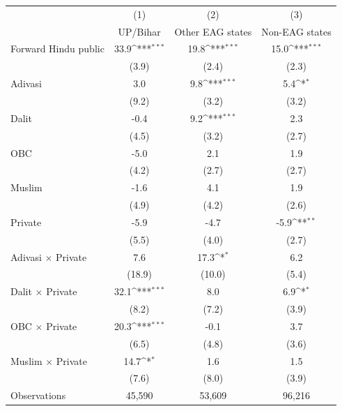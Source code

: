 {
\def\sym#1{\ifmmode^{#1}\else\(^{#1}\)\fi}
\begin{tabular}{l*{3}{c}}
\toprule
                    &\multicolumn{1}{c}{(1)}&\multicolumn{1}{c}{(2)}&\multicolumn{1}{c}{(3)}\\
                    &\multicolumn{1}{c}{UP/Bihar}&\multicolumn{1}{c}{Other EAG states}&\multicolumn{1}{c}{Non-EAG states}\\
\midrule
Forward Hindu public&        33.9\sym{***}&        19.8\sym{***}&        15.0\sym{***}\\
                    &       (3.9)         &       (2.4)         &       (2.3)         \\
\addlinespace
Adivasi             &         3.0         &         9.8\sym{***}&         5.4\sym{*}  \\
                    &       (9.2)         &       (3.2)         &       (3.2)         \\
\addlinespace
Dalit               &        -0.4         &         9.2\sym{***}&         2.3         \\
                    &       (4.5)         &       (3.2)         &       (2.7)         \\
\addlinespace
OBC                 &        -5.0         &         2.1         &         1.9         \\
                    &       (4.2)         &       (2.7)         &       (2.7)         \\
\addlinespace
Muslim              &        -1.6         &         4.1         &         1.9         \\
                    &       (4.9)         &       (4.2)         &       (2.6)         \\
\addlinespace
Private             &        -5.9         &        -4.7         &        -5.9\sym{**} \\
                    &       (5.5)         &       (4.0)         &       (2.7)         \\
\addlinespace
Adivasi $\times$ Private&         7.6         &        17.3\sym{*}  &         6.2         \\
                    &      (18.9)         &      (10.0)         &       (5.4)         \\
\addlinespace
Dalit $\times$ Private&        32.1\sym{***}&         8.0         &         6.9\sym{*}  \\
                    &       (8.2)         &       (7.2)         &       (3.9)         \\
\addlinespace
OBC $\times$ Private&        20.3\sym{***}&        -0.1         &         3.7         \\
                    &       (6.5)         &       (4.8)         &       (3.6)         \\
\addlinespace
Muslim $\times$ Private&        14.7\sym{*}  &         1.6         &         1.5         \\
                    &       (7.6)         &       (8.0)         &       (3.9)         \\
\midrule
Observations        &      45,590         &      53,609         &      96,216         \\
\bottomrule
\end{tabular}
}
